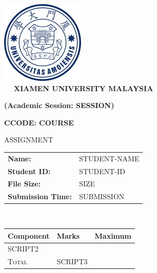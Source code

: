 \documentclass[12pt]{article}
\begin{document}
\begin{center}
	 \includegraphics[scale=3]{fig_logo.png}\\
	 \verb|  |
	 \centering
	 {\large \textbf{\textsf{XIAMEN UNIVERSITY MALAYSIA}}}

	 \textbf{\textsf{(Academic Session: SESSION)}}
	 
	 \vspace{20pt}
	 {\Large {\textbf{CCODE: COURSE
	 }}}
	 
	 
	 \vspace{5pt}
	 {\LARGE \textsc{ASSIGNMENT}}
	
	\vspace{15pt}
	
	\begin{tabularx}{1\textwidth} { 
		   >{\raggedleft\arraybackslash\hsize=0.5\hsize}X 
		   >{\raggedright\arraybackslash\hsize=0.5\hsize}X }
		\textbf{Name:} & STUDENT-NAME \\ 
		
		\textbf{Student ID:} & STUDENT-ID \\   
		
		\textbf{File Size:} & SIZE \\  
		
		\textbf{Submission Time:} & SUBMISSION \\
	\end{tabularx}
	\\
	\vspace{30pt}
	\setlength\arrayrulewidth{1pt}
	\def\arraystretch{1.75}
	\begin{tabularx}{0.8\textwidth}{
			|>{\centering\arraybackslash\hsize=0.5\hsize}X|
			>{\centering\arraybackslash\hsize=0.25\hsize}X|
			>{\centering\arraybackslash\hsize=0.25\hsize}X|
		}	
		\hline
		\rowcolor{LightOrange}
		\textbf{Component}& \textbf{Marks} & \textbf{Maximum} \\  \hline
		SCRIPT2 \\ \hline
		\rowcolor{LightBlue}
		\textsc{Total} &  SCRIPT3  \\ \hline
	\end{tabularx}
\end{center}
\end{document}
